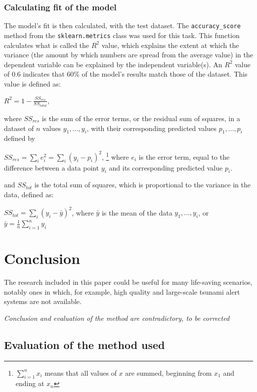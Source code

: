 \documentclass[11pt,letterpaper]{article}
\begin{document}
\subsubsection{Calculating fit of the model}

The model's fit is then calculated, with the test dataset. The \verb|accuracy_score| method from the \verb|sklearn.metrics| class was used for this task. This function calculates what is called the $R^2$ value, which explains the extent at which the variance (the amount by which numbers are spread from the average value) in the dependent variable can be explained by the independent variable(s). An $R^2$ value of 0.6 indicates that 60\% of the model's results match those of the dataset. This value is defined as:

$R^2 = 1 - \frac{SS_{res}}{SS_{total}}$,

where $SS_{res}$ is the sum of the error terms, or the residual sum of squares, in a dataset of $n$ values $y_1,\dots, y_i$, with their corresponding predicted values $p_1,\dots, p_i$ defined by

$SS_{res} = \sum\limits_{i} e_i^2 = \sum\limits_{i} (y_i - p_i)^2$, \footnote{$\sum\limits_{i=1}^n x_i$ means that all values of $x$ are summed, beginning from $x_1$ and ending at $x_n$} where $e_i$ is the error term, equal to the difference between a data point $y_i$ and its corresponding predicted value $p_i$.

and $SS_{tot}$ is the total sum of squares, which is proportional to the variance in the data, defined as:

$SS_{tot} = \sum\limits_{i} (y_i - \bar y)^2$, where $\bar y$ is the mean of the data $y_1,\dots, y_i$, or $\bar y = \frac{1}{n} \sum\limits_{i=1}^n y_i$



\section{Conclusion}

The research included in this paper could be useful for many life-saving scenarios, notably ones in which, for example, high quality and large-scale tsunami alert systems are not available.

\textit{Conclusion and evaluation of the method are contradictory, to be corrected}

\subsection{Evaluation of the method used}
\end{document}

